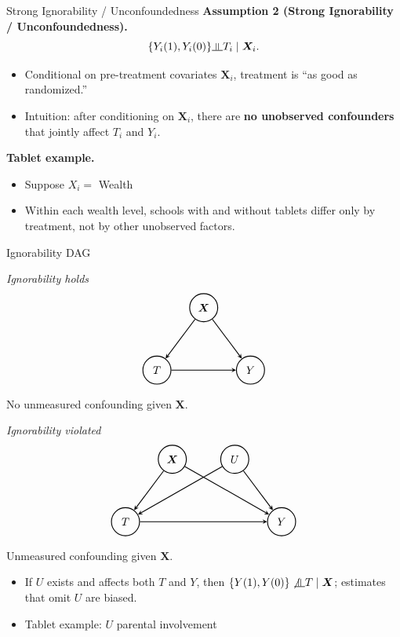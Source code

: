 \documentclass[10pt]{beamer}
\newcommand{\indep}{\rotatebox[origin=c]{90}{$\models$}}
\theoremstyle{plain}
\newcommand{\bX}{\bm{X}}
\begin{document}
\begin{frame}{Strong Ignorability / Unconfoundedness}
  \textbf{Assumption 2 (Strong Ignorability / Unconfoundedness).}
  \[
    \{Y_i(1),Y_i(0)\} \indep T_i \mid \bX_i.
  \]
  \pause
  \begin{itemize}
    \item Conditional on pre-treatment covariates \(\bX_i\), treatment is ``as good as randomized.''
    \item Intuition: after conditioning on \(\bX_i\), there are \textbf{no unobserved confounders} that jointly affect \(T_i\) and \(Y_i\).
  \end{itemize}
  \vspace{0.3cm}
  \pause
  \textbf{Tablet example.}
  \begin{itemize}
    \item Suppose \(X_i =\) Wealth 
    \item Within each wealth level, schools with and without tablets differ only by treatment, not by other unobserved factors.
  \end{itemize}
\end{frame}

\begin{frame}{Ignorability DAG}
    \begin{center}
\begin{minipage}{0.47\linewidth}
\centering
\textit{Ignorability holds}
\[
\begin{tikzpicture}[
    >=stealth,
    line width=0.8pt,
    every node/.style={circle, draw, minimum size=9mm, inner sep=0pt}
]
  \node (T) at (1,0)      {$T$};
  \node (Y) at (4,0)    {$Y$};
  \node (X) at (2.5, 2) {$\bX$};

  \draw[->] (X) -- (Y);
  \draw[->] (X) -- (T);
  \draw[->] (T) -- (Y);
\end{tikzpicture}
\]
No unmeasured confounding given $\bX$.
\end{minipage}\hfill
\begin{minipage}{0.47\linewidth}
\centering
\textit{Ignorability violated}
\[
\begin{tikzpicture} [>=stealth,
    line width=0.8pt,
    every node/.style={circle, draw, minimum size=9mm, inner sep=0pt}]
  \node (T) at (1,0)      {$T$};
  \node (Y) at (6,0)    {$Y$};
  \node (X) at (2.5, 2) {$\bX$};
  \node (U) at (4.5, 2) {$U$};
  
  \draw[->] (X) -- (T);
  \draw[->] (X) -- (Y);
  \draw[->] (U) -- (T);
  \draw[->] (U) -- (Y);
  \draw[->] (T) -- (Y);
\end{tikzpicture}
\]
Unmeasured confounding given $\bX$.
\end{minipage}
\end{center}
\begin{itemize}
    \item If \(U\) exists and affects both \(T\) and \(Y\), then \(\{Y(1),Y(0)\} \not\!\indep T \mid \bX\); estimates that omit \(U\) are biased.
    \item Tablet example: $U$ parental involvement
\end{itemize}
\end{frame}
\end{document}
